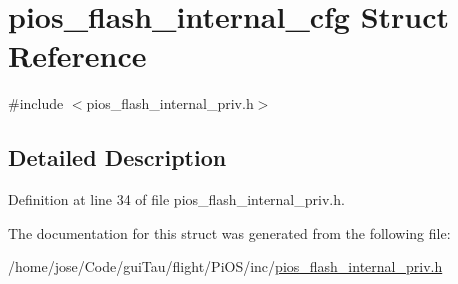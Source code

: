 \hypertarget{structpios__flash__internal__cfg}{\section{pios\-\_\-flash\-\_\-internal\-\_\-cfg Struct Reference}
\label{structpios__flash__internal__cfg}
}


{\ttfamily \#include $<$pios\-\_\-flash\-\_\-internal\-\_\-priv.\-h$>$}



\subsection{Detailed Description}


Definition at line 34 of file pios\-\_\-flash\-\_\-internal\-\_\-priv.\-h.



The documentation for this struct was generated from the following file\-:\begin{DoxyCompactItemize}
\item 
/home/jose/\-Code/gui\-Tau/flight/\-Pi\-O\-S/inc/\hyperlink{pios__flash__internal__priv_8h}{pios\-\_\-flash\-\_\-internal\-\_\-priv.\-h}\end{DoxyCompactItemize}
